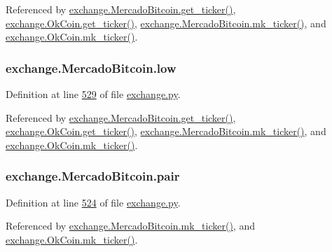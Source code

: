 Referenced by \hyperlink{exchange_8py_source_l00535}{exchange.\+Mercado\+Bitcoin.\+get\+\_\+ticker()}, \hyperlink{exchange_8py_source_l00600}{exchange.\+Ok\+Coin.\+get\+\_\+ticker()}, \hyperlink{exchange_8py_source_l00549}{exchange.\+Mercado\+Bitcoin.\+mk\+\_\+ticker()}, and \hyperlink{exchange_8py_source_l00614}{exchange.\+Ok\+Coin.\+mk\+\_\+ticker()}.

\subsubsection[{\texorpdfstring{low}{low}}]{\setlength{\rightskip}{0pt plus 5cm}exchange.\+Mercado\+Bitcoin.\+low}\hypertarget{classexchange_1_1_mercado_bitcoin_aaa3aae824bfc5ba3b7dc5252e9554713}{}\label{classexchange_1_1_mercado_bitcoin_aaa3aae824bfc5ba3b7dc5252e9554713}


Definition at line \hyperlink{exchange_8py_source_l00529}{529} of file \hyperlink{exchange_8py_source}{exchange.\+py}.



Referenced by \hyperlink{exchange_8py_source_l00535}{exchange.\+Mercado\+Bitcoin.\+get\+\_\+ticker()}, \hyperlink{exchange_8py_source_l00600}{exchange.\+Ok\+Coin.\+get\+\_\+ticker()}, \hyperlink{exchange_8py_source_l00549}{exchange.\+Mercado\+Bitcoin.\+mk\+\_\+ticker()}, and \hyperlink{exchange_8py_source_l00614}{exchange.\+Ok\+Coin.\+mk\+\_\+ticker()}.

\subsubsection[{\texorpdfstring{pair}{pair}}]{\setlength{\rightskip}{0pt plus 5cm}exchange.\+Mercado\+Bitcoin.\+pair}\hypertarget{classexchange_1_1_mercado_bitcoin_a879f8ca352d313230d72e6e8785985a1}{}\label{classexchange_1_1_mercado_bitcoin_a879f8ca352d313230d72e6e8785985a1}


Definition at line \hyperlink{exchange_8py_source_l00524}{524} of file \hyperlink{exchange_8py_source}{exchange.\+py}.



Referenced by \hyperlink{exchange_8py_source_l00549}{exchange.\+Mercado\+Bitcoin.\+mk\+\_\+ticker()}, and \hyperlink{exchange_8py_source_l00614}{exchange.\+Ok\+Coin.\+mk\+\_\+ticker()}.

